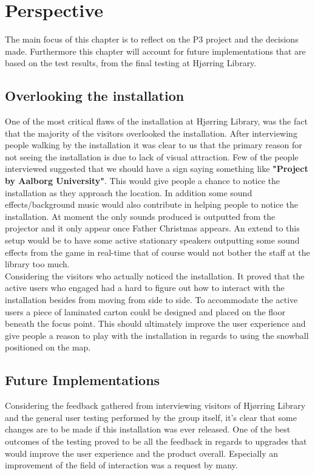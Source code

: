 \chapter{Perspective}
The main focus of this chapter is to reflect on the P3 project and the decisions made. Furthermore this chapter will account for future implementations that are based on the test results, from the final testing at Hj{\o}rring Library.
\section{Overlooking the installation}
One of the most critical flaws of the installation at Hj{\o}rring Library, was the fact that the majority of the visitors overlooked the installation. After interviewing people walking by the installation it was clear to us that the primary reason for not seeing the installation is due to lack of visual attraction. Few of the people interviewed suggested that we should have a sign saying something like \textbf{"Project by Aalborg University"}. This would give people a chance to notice the installation as they approach the location. In addition some sound effects/background music would also contribute in helping people to notice the installation. At moment the only sounds produced is outputted from the projector and it only appear once Father Christmas appears. An extend to this setup would be to have some active stationary speakers outputting some sound effects from the game in real-time that of course would not bother the staff at the library too much.\\
Considering the visitors who actually noticed the installation. It proved that the active users who engaged had a hard to figure out how to interact with the installation besides from moving from side to side. To accommodate the active users a piece of laminated carton could be designed and placed on the floor beneath the focus point. This should ultimately improve the user experience and give people a reason to play with the installation in regards to using the snowball positioned on the map.\\
\section{Future Implementations}
Considering the feedback gathered from interviewing visitors of Hj{\o}rring Library and the general user testing performed by the group itself, it's clear that some changes are to be made if this installation was ever released. One of the best outcomes of the testing proved to be all the feedback in regards to upgrades that would improve the user experience and the product overall. Especially an improvement of the field of interaction was a request by many.
